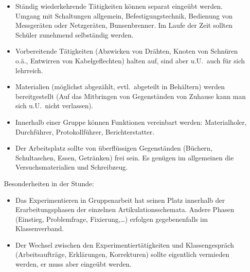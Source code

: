 \begin{itemize}
\begin{itemize}
	\end{itemize}
	
	\item
	St\"{a}ndig wiederkehrende T\"{a}tigkeiten k\"{o}nnen separat einge\"{u}bt werden.
	Umgang mit Schaltungen allgemein, Befestigungstechnik,
	Bedienung von Messger\"{a}ten oder Netzger\"{a}ten, Bunsenbrenner.
	Im Laufe der Zeit sollten Sch\"{u}ler zunehmend selbst\"{a}ndig werden.
	
	\item
	Vorbereitende T\"{a}tigkeiten (Abzwicken von Dr\"{a}hten,
	Knoten von Schn\"{u}ren o.\"{a}., Entwirren von Kabelgeflechten)
	halten auf, sind aber u.U.\ auch f\"{u}r sich lehrreich.
	\item
	Materialien (m\"{o}glichst abgez\"{a}hlt, evtl.\ abgeteilt in Beh\"{a}ltern)
	werden bereitgestellt
	(Auf das Mitbringen von Gegenst\"{a}nden von Zuhause kann man sich u.U.\
	nicht verlassen).
	\item
	Innerhalb einer Gruppe k\"{o}nnen Funktionen vereinbart werden:
	Materialholer, Durchf\"{u}hrer, Protokollf\"{u}hrer, Berichterstatter.
	\item
	Der Arbeitsplatz sollte von \"{u}berfl\"{u}ssigen Gegenst\"{a}nden (B\"{u}chern,
	Schultaschen, Essen, Getr\"{a}nken) frei sein.
	Es gen\"{u}gen im allgemeinen die Versuchsmaterialien und Schreibzeug.
\end{itemize}
	
Besonderheiten in der Stunde:
\begin{itemize}
	\item
	Das Experimentieren in Gruppenarbeit hat seinen Platz innerhalb der
	Erarbeitungsphasen der einzelnen Artikulationsschemata.
	Andere Phasen (Einstieg, Problemfrage, Fixierung,\dots)
	erfolgen gegebenenfalls im Klassenverband.
	\item
	Der Wechsel zwischen den Experimentiert\"{a}tigkeiten und
	Klassengespr\"{a}ch (Arbeitsauftr\"{a}ge, Erkl\"{a}rungen, Korrekturen)
	sollte eigentlich vermieden werden,
	er muss aber einge\"{u}bt werden.
\end{itemize}

\bip\bip
